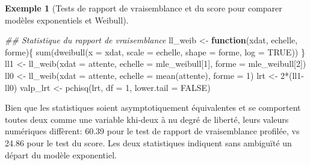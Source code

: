 \documentclass[
  11pt,
  letterpaper,
]{scrbook}
\newenvironment{Shaded}{\begin{snugshade}}{\end{snugshade}}
\newcommand{\AttributeTok}[1]{\textcolor[rgb]{0.40,0.45,0.13}{#1}}
\newcommand{\ConstantTok}[1]{\textcolor[rgb]{0.56,0.35,0.01}{#1}}
\newcommand{\ControlFlowTok}[1]{\textcolor[rgb]{0.00,0.23,0.31}{\textbf{#1}}}
\newcommand{\DecValTok}[1]{\textcolor[rgb]{0.68,0.00,0.00}{#1}}
\newcommand{\DocumentationTok}[1]{\textcolor[rgb]{0.37,0.37,0.37}{\textit{#1}}}
\newcommand{\FunctionTok}[1]{\textcolor[rgb]{0.28,0.35,0.67}{#1}}
\newcommand{\NormalTok}[1]{\textcolor[rgb]{0.00,0.23,0.31}{#1}}
\newcommand{\OtherTok}[1]{\textcolor[rgb]{0.00,0.23,0.31}{#1}}
\newcommand{\SpecialCharTok}[1]{\textcolor[rgb]{0.37,0.37,0.37}{#1}}
\theoremstyle{plain}
\theoremstyle{plain}
\theoremstyle{definition}
\newtheorem{example}{Exemple}[chapter]
\theoremstyle{definition}
\theoremstyle{remark}
\begin{document}
\begin{example}[Tests de rapport de vraisemblance et du score pour
comparer modèles exponentiels et
Weibull]
\begin{Shaded}
\begin{Highlighting}[]
\DocumentationTok{\#\# Statistique du rapport de vraisemblance}
\NormalTok{ll\_weib }\OtherTok{\textless{}{-}} \ControlFlowTok{function}\NormalTok{(xdat, echelle, forme)\{}
  \FunctionTok{sum}\NormalTok{(}\FunctionTok{dweibull}\NormalTok{(}\AttributeTok{x =}\NormalTok{ xdat, }\AttributeTok{scale =}\NormalTok{ echelle, }\AttributeTok{shape =}\NormalTok{ forme, }\AttributeTok{log =} \ConstantTok{TRUE}\NormalTok{))}
\NormalTok{\}}
\NormalTok{ll1 }\OtherTok{\textless{}{-}} \FunctionTok{ll\_weib}\NormalTok{(}\AttributeTok{xdat =}\NormalTok{ attente, }\AttributeTok{echelle =}\NormalTok{ mle\_weibull[}\DecValTok{1}\NormalTok{], }\AttributeTok{forme =}\NormalTok{ mle\_weibull[}\DecValTok{2}\NormalTok{])}
\NormalTok{ll0 }\OtherTok{\textless{}{-}} \FunctionTok{ll\_weib}\NormalTok{(}\AttributeTok{xdat =}\NormalTok{ attente, }\AttributeTok{echelle =} \FunctionTok{mean}\NormalTok{(attente), }\AttributeTok{forme =} \DecValTok{1}\NormalTok{)}
\NormalTok{lrt }\OtherTok{\textless{}{-}} \DecValTok{2}\SpecialCharTok{*}\NormalTok{(ll1}\SpecialCharTok{{-}}\NormalTok{ll0)}
\NormalTok{valp\_lrt }\OtherTok{\textless{}{-}} \FunctionTok{pchisq}\NormalTok{(lrt, }\AttributeTok{df =} \DecValTok{1}\NormalTok{, }\AttributeTok{lower.tail =} \ConstantTok{FALSE}\NormalTok{)}
\end{Highlighting}
\end{Shaded}

Bien que les statistiques soient asymptotiquement équivalentes et se
comportent toutes deux comme une variable khi-deux à nu degré de
liberté, leurs valeurs numériques diffèrent: 60.39 pour le test de
rapport de vraisemblance profilée, vs 24.86 pour le test du score. Les
deux statistiques indiquent sans ambiguïté un départ du modèle
exponentiel.

\end{example}
\end{document}
